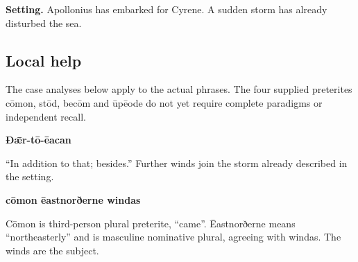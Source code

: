 \textbf{Setting.} Apollonius has embarked for Cyrene. A sudden storm has already disturbed the sea.

\par\begin{minipage}{\linewidth}\raggedright
{}
\end{minipage}\par

\subsection*{Local help}

The case analyses below apply to the actual phrases. The four supplied preterites cōmon, stōd, becōm and ūpēode do not yet require complete paradigms or independent recall.

\textbf{Ðǣr-tō-ēacan}

“In addition to that; besides.” Further winds join the storm already described in the setting.

\textbf{cōmon ēastnorðerne windas}

Cōmon is third-person plural preterite, “came”. Ēastnorðerne means “northeasterly” and is masculine nominative plural, agreeing with windas. The winds are the subject.

